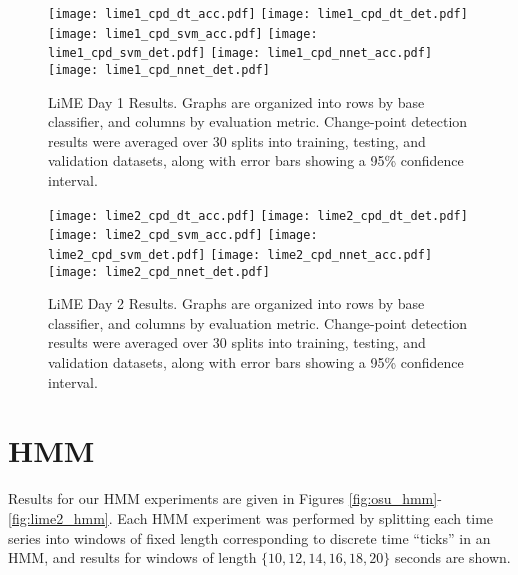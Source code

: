 \begin{figure}[H]
 \centering
 \texttt{[image: lime1\_cpd\_dt\_acc.pdf]} \hspace{1em}\vspace{1em}
 \texttt{[image: lime1\_cpd\_dt\_det.pdf]}
 \texttt{[image: lime1\_cpd\_svm\_acc.pdf]} \hspace{1em}\vspace{1em}
 \texttt{[image: lime1\_cpd\_svm\_det.pdf]}
 \texttt{[image: lime1\_cpd\_nnet\_acc.pdf]} \hspace{1em}
 \texttt{[image: lime1\_cpd\_nnet\_det.pdf]}
 \caption{LiME Day 1 Results. Graphs are organized into rows by base classifier,
  and columns by evaluation metric. Change-point detection results were averaged over
  30 splits into training, testing, and validation datasets,
  along with error bars showing a 95\% confidence interval.}
 \label{fig:lime1_cpd}
\end{figure}

\begin{figure}[H]
 \centering
 \texttt{[image: lime2\_cpd\_dt\_acc.pdf]} \hspace{1em}\vspace{1em}
 \texttt{[image: lime2\_cpd\_dt\_det.pdf]}
 \texttt{[image: lime2\_cpd\_svm\_acc.pdf]} \hspace{1em}\vspace{1em}
 \texttt{[image: lime2\_cpd\_svm\_det.pdf]}
 \texttt{[image: lime2\_cpd\_nnet\_acc.pdf]} \hspace{1em}
 \texttt{[image: lime2\_cpd\_nnet\_det.pdf]}
 \caption{LiME Day 2 Results. Graphs are organized into rows by base classifier,
  and columns by evaluation metric. Change-point detection results were averaged over
  30 splits into training, testing, and validation datasets,
  along with error bars showing a 95\% confidence interval.}
 \label{fig:lime2_cpd}
\end{figure}


\section{HMM}

Results for our HMM experiments are given in
Figures \ref{fig:osu_hmm}-\ref{fig:lime2_hmm}. Each HMM experiment was
performed by splitting each time series into windows of fixed length
corresponding to discrete time ``ticks'' in an HMM,
and results for windows of length $\{10, 12, 14, 16, 18, 20\}$
seconds are shown.

